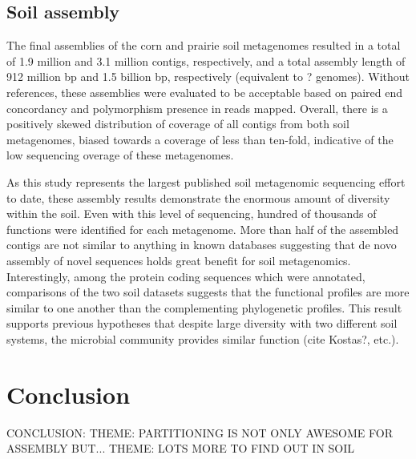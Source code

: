 \documentclass[11pt]{article} %
\begin{document}
\subsection{Soil assembly}
The final assemblies of the corn and prairie soil metagenomes resulted in a total of 1.9 million and 3.1 million contigs, respectively, and a total assembly length of 912 million bp and 1.5 billion bp, respectively (equivalent to ? genomes).  Without references, these assemblies were evaluated to be acceptable based on paired end concordancy and polymorphism presence in reads mapped.   Overall, there is a positively skewed distribution of coverage of all contigs from both soil metagenomes, biased towards a coverage of less than ten-fold, indicative of the low sequencing overage of these metagenomes.  

As this study represents the largest published soil metagenomic sequencing effort to date, these assembly results demonstrate the enormous amount of diversity within the soil.  Even with this level of sequencing, hundred of thousands of functions were identified for each metagenome.  More than half of the assembled contigs are not similar to anything in known databases suggesting that de novo assembly of novel sequences holds great benefit for soil metagenomics.  Interestingly, among the protein coding sequences which were annotated, comparisons of the two soil datasets suggests that the functional profiles are more similar to one another than the complementing phylogenetic profiles.  This result supports previous hypotheses that despite large diversity with two different soil systems, the microbial community provides similar function (cite Kostas?, etc.).  

\section{Conclusion}
CONCLUSION:  
THEME: PARTITIONING IS NOT ONLY AWESOME FOR ASSEMBLY BUT...
THEME:  LOTS MORE TO FIND OUT IN SOIL
\end{document}
